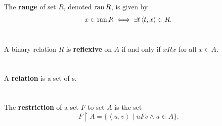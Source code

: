 \documentclass{report}
\begin{document}
The \textbf{range} of set $R$, denoted $\mathop{\text{ran}}{R}$, is given by
  $$x \in \mathop{\text{ran}}{R} \iff \exists t \left< t, x \right> \in R.$$

\begin{definition}


\end{definition}

\section{}%
\label{ref:reflexive}

A binary relation $R$ is \textbf{reflexive} on $A$ if and only if $xRx$ for all
  $x \in A$.

\begin{definition}


\end{definition}

\section{}%
\label{ref:relation}

A \textbf{relation} is a set of s.

\begin{definition}


\end{definition}

\section{}%
\label{ref:restriction}

The \textbf{restriction} of a set $F$ to set $A$ is the set
  $$F \restriction A = \{\left< u, v \right> \mid uFv \land u \in A\}.$$

\begin{definition}


\end{definition}

\section{}%
\label{ref:subset-axioms}
\end{document}
